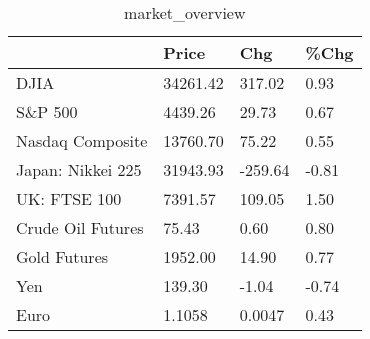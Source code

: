 \documentclass{article}%
\begin{document}
%


\begin{table}[htbp]%
\caption{market\_overview}%
\centering%
\begin{adjustbox}{width=1\textwidth}%
\begin{tabular}{llll}
\toprule
                  &    Price &     Chg &  \%Chg \\
\midrule
             DJIA & 34261.42 &  317.02 &  0.93 \\
          S\&P 500 &  4439.26 &   29.73 &  0.67 \\
 Nasdaq Composite & 13760.70 &   75.22 &  0.55 \\
Japan: Nikkei 225 & 31943.93 & -259.64 & -0.81 \\
     UK: FTSE 100 &  7391.57 &  109.05 &  1.50 \\
Crude Oil Futures &    75.43 &    0.60 &  0.80 \\
     Gold Futures &  1952.00 &   14.90 &  0.77 \\
              Yen &   139.30 &   -1.04 & -0.74 \\
             Euro &   1.1058 &  0.0047 &  0.43 \\
\bottomrule
\end{tabular}
%
\end{adjustbox}%
\end{table}

%
\end{document}

